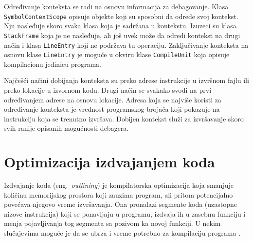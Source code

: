 \documentclass[12pt,oneside]{memoir}
\begin{document}
Određivanje konteksta se radi na osnovu informacija za debagovanje.
Klasa \verb|SymbolContextScope| opisuje objekte koji su sposobni da odrede svoj kontekst.
Nju nasleđuje skoro svaka klasa koja je sadržana u kontekstu.
Izuzeci su klasa \verb|StackFrame| koja je ne nasleđuje, ali još uvek može da odredi kontekst na drugi način i klasa \verb|LineEntry| koji ne podržava tu operaciju.
Zaključivanje konteksta na osnovu klase \verb|LineEntry| je moguće u okviru klase \verb|CompileUnit| koja opisuje kompilacionu jedinicu programa.

Najčešći načini dobijanja konteksta su preko adrese instrukcije u izvršnom fajlu ili preko lokacije u izvornom kodu.
Drugi način se svakako svodi na prvi određivanjem adrese na osnovu lokacije.
Adresa koja se najviše koristi za određivanje konteksta je vrednost programskog brojača koji pokazuje na instrukciju koja se trenutno izvršava.
Dobijen kontekst služi za izvršavanje skoro svih ranije opisanih mogućnosti debagera.


\chapter{Optimizacija izdvajanjem koda}
\label{sec:outlining}



Izdvajanje koda (eng.~{\em outlining}) je kompilatorska optimizacija koja smanjuje količinu memorijskog prostora koji zauzima program, ali pritom potencijalno povećava njegovo vreme izvršavanja.
Ona pronalazi segmente koda (uzastopne nizove instrukcija) koji se ponavljaju u programu, izdvaja ih u zasebnu funkciju i menja pojavljivanja tog segmenta sa pozivom ka novoj funkciji.
U nekim slučajevima moguće je da se ubrza i vreme potrebno za kompilaciju programa \cite{grune2012design}.
\end{document}
